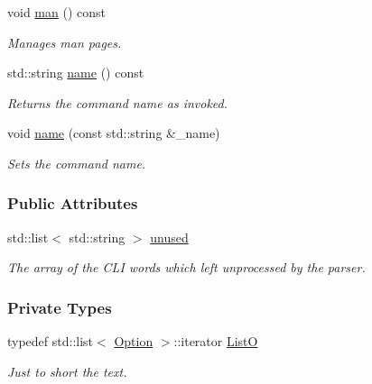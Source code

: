 \begin{DoxyCompactItemize}
void \hyperlink{classpoptmx_1_1OptionTable_ac87bd15ce01d4629fb70e28d71393b2b}{man} () const 
\begin{DoxyCompactList}\small\item\em Manages man pages. \item\end{DoxyCompactList}\item 
std::string \hyperlink{classpoptmx_1_1OptionTable_a05e3e6f496cf3a0d946e6d2574477418}{name} () const 
\begin{DoxyCompactList}\small\item\em Returns the command name as invoked. \item\end{DoxyCompactList}\item 
void \hyperlink{classpoptmx_1_1OptionTable_a0a97b02794a0f8745e79b33162fbb8af}{name} (const std::string \&\_\-name)
\begin{DoxyCompactList}\small\item\em Sets the command name. \item\end{DoxyCompactList}\end{DoxyCompactItemize}
\subsubsection*{Public Attributes}
\begin{DoxyCompactItemize}
\item 
std::list$<$ std::string $>$ \hyperlink{classpoptmx_1_1OptionTable_a07cd1458c18f70d0cb5c7e9a3489c04f}{unused}
\begin{DoxyCompactList}\small\item\em The array of the CLI words which left unprocessed by the parser. \item\end{DoxyCompactList}\end{DoxyCompactItemize}
\subsubsection*{Private Types}
\begin{DoxyCompactItemize}
\item 
typedef std::list$<$ \hyperlink{classpoptmx_1_1Option}{Option} $>$::iterator \hyperlink{classpoptmx_1_1OptionTable_abaa488ce786d8d553d851d225a82d804}{ListO}
\begin{DoxyCompactList}\small\item\em Just to short the text. \item\end{DoxyCompactList}\end{DoxyCompactItemize}
